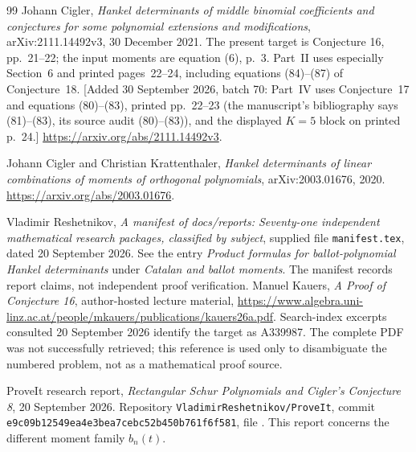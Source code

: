 \documentclass[11pt]{article}
\theoremstyle{definition}
\theoremstyle{remark}
\newcommand{\pin}{e9c09b12549ea4e3bea7cebc52b450b761f6f581}
\theoremstyle{definition}
\theoremstyle{plain}
\numberwithin{equation}{section}
\begin{document}
\begin{thebibliography}{99}
Johann Cigler,
\emph{Hankel determinants of middle binomial coefficients and conjectures
for some polynomial extensions and modifications},
arXiv:2111.14492v3, 30 December 2021.
The present target is Conjecture 16, pp.~21--22; the input moments are
equation (6), p.~3.
Part~II uses especially Section~6 and printed pages~22--24, including
equations (84)--(87) of Conjecture~18.
[Added 30 September 2026, batch 70: Part~IV uses Conjecture~17 and
equations (80)--(83), printed pp.~22--23 (the manuscript's bibliography
says (81)--(83), its source audit (80)--(83)), and the displayed $K=5$
block on printed p.~24.]
\url{https://arxiv.org/abs/2111.14492v3}.

Johann Cigler and Christian Krattenthaler,
\emph{Hankel determinants of linear combinations of moments of orthogonal
polynomials}, arXiv:2003.01676, 2020.
\url{https://arxiv.org/abs/2003.01676}.

Vladimir Reshetnikov,
\emph{A manifest of docs/reports: Seventy-one independent mathematical
research packages, classified by subject}, supplied file
\texttt{manifest.tex}, dated 20 September 2026.
See the entry \emph{Product formulas for ballot-polynomial Hankel
determinants} under \emph{Catalan and ballot moments}.
The manifest records report claims, not independent proof verification.
Manuel Kauers,
\emph{A Proof of Conjecture 16}, author-hosted lecture material,
\url{https://www.algebra.uni-linz.ac.at/people/mkauers/publications/kauers26a.pdf}.
Search-index excerpts consulted 20 September 2026 identify the target as
A339987. The complete PDF was not successfully retrieved; this reference
is used only to disambiguate the numbered problem, not as a mathematical
proof source.

\par\raggedright
{}
ProveIt research report,
\emph{Rectangular Schur Polynomials and Cigler's Conjecture 8},
20 September 2026. Repository \texttt{VladimirReshetnikov/ProveIt}, commit
\texttt{\pin}, file
.
This report concerns the different moment family $b_n(t)$.


\end{thebibliography}
\end{document}
